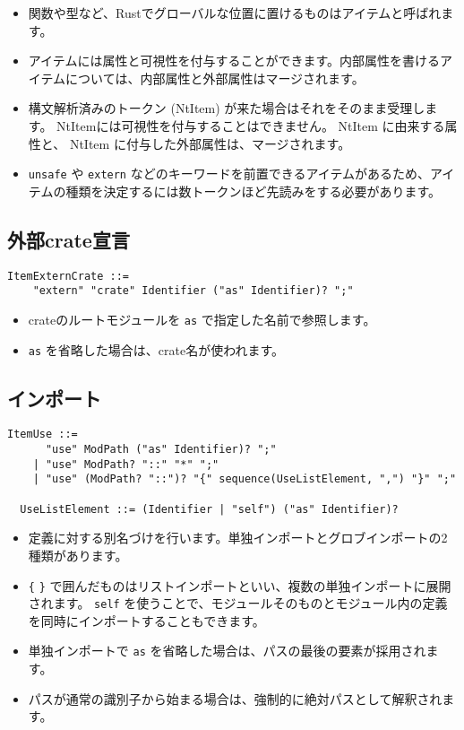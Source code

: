 \documentclass[dvipdfmx,uplatex,papersize,a4paper,10pt]{jsbook}
\theoremstyle{definition}
\begin{document}
\begin{itemize}
  \item 関数や型など、Rustでグローバルな位置に置けるものはアイテムと呼ばれます。
  \item アイテムには属性と可視性を付与することができます。内部属性を書けるアイテムについては、内部属性と外部属性はマージされます。
  \item 構文解析済みのトークン (NtItem) が来た場合はそれをそのまま受理します。 NtItemには可視性を付与することはできません。 NtItem に由来する属性と、 NtItem に付与した外部属性は、マージされます。
  \item \verb|unsafe| や \verb|extern| などのキーワードを前置できるアイテムがあるため、アイテムの種類を決定するには数トークンほど先読みをする必要があります。
\end{itemize}

\subsection{外部crate宣言}

\begin{lstlisting}[language=BNFLike, gobble=2]
  ItemExternCrate ::=
    "extern" "crate" Identifier ("as" Identifier)? ";"
\end{lstlisting}

\begin{itemize}
  \item crateのルートモジュールを \verb|as| で指定した名前で参照します。
  \item \verb|as| を省略した場合は、crate名が使われます。
\end{itemize}

\subsection{インポート}

\begin{lstlisting}[language=BNFLike, gobble=2]
  ItemUse ::=
      "use" ModPath ("as" Identifier)? ";"
    | "use" ModPath? "::" "*" ";"
    | "use" (ModPath? "::")? "{" sequence(UseListElement, ",") "}" ";"

  UseListElement ::= (Identifier | "self") ("as" Identifier)?
\end{lstlisting}

\begin{itemize}
  \item 定義に対する別名づけを行います。単独インポートとグロブインポートの2種類があります。
  \item \verb|{| \verb|}| で囲んだものはリストインポートといい、複数の単独インポートに展開されます。 \verb|self| を使うことで、モジュールそのものとモジュール内の定義を同時にインポートすることもできます。
  \item 単独インポートで \verb|as| を省略した場合は、パスの最後の要素が採用されます。
  \item パスが通常の識別子から始まる場合は、強制的に絶対パスとして解釈されます。
\end{itemize}
\end{document}
